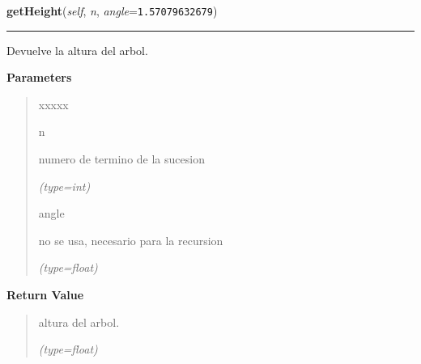 \hspace{.8\funcindent}\begin{boxedminipage}{\funcwidth}

    \raggedright \textbf{getHeight}(\textit{self}, \textit{n}, \textit{angle}={\tt 1.57079632679})

    \vspace{-1.5ex}

    \rule{\textwidth}{0.5\fboxrule}
\setlength{\parskip}{2ex}
    Devuelve la altura del arbol.

\setlength{\parskip}{1ex}
      \textbf{Parameters}
      \vspace{-1ex}

      \begin{quote}
        \begin{Ventry}{xxxxx}

          \item[n]

          numero de termino de la sucesion

            {\it (type=int)}

          \item[angle]

          no se usa, necesario para la recursion

            {\it (type=float)}

        \end{Ventry}

      \end{quote}

      \textbf{Return Value}
    \vspace{-1ex}

      \begin{quote}
      altura del arbol.

      {\it (type=float)}

      \end{quote}

    \end{boxedminipage}

    \label{FractalZE:arbol:Arbol:getWidth}

    \vspace{0.5ex}

